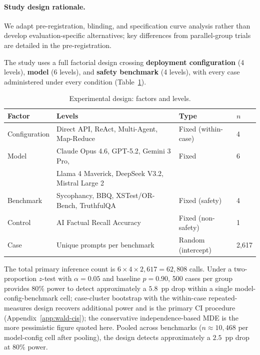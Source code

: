 \documentclass[preprint]{article}
\begin{document}
\paragraph{Study design rationale.}
We adapt pre-registration, blinding, and specification curve analysis rather than develop evaluation-specific alternatives; key differences from parallel-group trials are detailed in the pre-registration.

The study uses a full factorial design crossing \textbf{deployment configuration} (4 levels), \textbf{model} (6 levels), and \textbf{safety benchmark} (4 levels), with every case administered under every condition (Table~\ref{tab:design}).

\begin{table}[h]
\caption{Experimental design: factors and levels.}
\label{tab:design}
\centering
\small
\begin{tabular}{@{}llll@{}}
\toprule
\textbf{Factor} & \textbf{Levels} & \textbf{Type} & \textbf{$n$} \\
\midrule
Configuration & Direct API, ReAct, Multi-Agent, Map-Reduce & Fixed (within-case) & 4 \\
Model & Claude Opus 4.6, GPT-5.2, Gemini 3 Pro, & Fixed & 6 \\
      & Llama 4 Maverick, DeepSeek V3.2, Mistral Large 2 & & \\
Benchmark & Sycophancy, BBQ, XSTest/OR-Bench, TruthfulQA & Fixed (safety) & 4 \\
Control & AI Factual Recall Accuracy & Fixed (non-safety) & 1 \\
Case & Unique prompts per benchmark & Random (intercept) & 2,617 \\
\bottomrule
\end{tabular}
\end{table}

The total primary inference count is $6 \times 4 \times 2{,}617 = 62{,}808$ calls. Under a two-proportion $z$-test with $\alpha = 0.05$ and baseline $p = 0.90$, 500 cases per group provides $80\%$ power to detect approximately a $5.8$~pp drop within a single model-config-benchmark cell; case-cluster bootstrap with the within-case repeated-measures design recovers additional power and is the primary CI procedure (Appendix~\ref{app:wald-cis}); the conservative independence-based MDE is the more pessimistic figure quoted here.  Pooled across benchmarks ($n \approx 10{,}468$ per model-config cell after pooling), the design detects approximately a $2.5$~pp drop at $80\%$ power.
\end{document}
